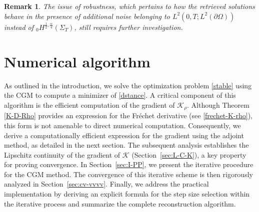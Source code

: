 \documentclass[a4paper,12pt,reqno,natbib]{amsart}
\newtheorem{remark}[theorem]{Remark}
\begin{document}
{\begin{remark}
    The issue of robustness, which pertains to how the retrieved solutions behave in the presence of additional noise belonging to $L^2(0,T;L^2(\partial\Omega))$ instead of ${}_0H^{\frac{1}{2},\frac{\alpha}{4} }\left(\Sigma_{T}\right)$, still requires further investigation.
\end{remark}


















\section{Numerical algorithm}\label{sec:algorithm}




As outlined in the introduction, we solve the optimization problem \eqref{stable} using the CGM to compute a minimizer of \eqref{dstance}. A critical component of this algorithm is the efficient computation of the gradient of $\mathcal{K}_\rho$. Although Theorem \ref{K-D-Rho} provides an expression for the Fr\'echet derivative (see \eqref{frechet-K-rho}), this form is not amenable to direct numerical computation. Consequently, we derive a computationally efficient expression for the gradient using the adjoint method, as detailed in the next section. The subsequent analysis establishes the Lipschitz continuity of the gradient of $\mathcal{K}$ (Section~\ref{sec:L-C-K}), a key property for proving convergence. In Section~\ref{sec:I-PP}, we present the iterative procedure for the CGM method. The convergence of this iterative scheme is then rigorously analyzed in Section~\ref{sec:cv-vvvv}. Finally, we address the practical implementation by deriving an explicit formula for the step size selection within the iterative process and summarize the complete reconstruction algorithm.


}
\end{document}
